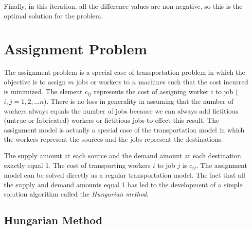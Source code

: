 \documentclass[12pt]{article}
\begin{document}
Finally, in this iteration, all the difference values are non-negative, so this is the optimal solution for the problem.

\section{Assignment Problem}

The assignment problem is a special case of transportation problem in which the objective is to
assign  $m$ jobs or workers to  $n$ machines such that the cost incurred is minimized.
The element $c_{ij}$ represents the cost of assigning worker $i$ to job ($i,j= 1,2, \ldots n$). There is no loss in
generality in assuming that the number of workers always equals the number of jobs because we
can always add fictitious (untrue or fabricated) workers or fictitious jobs to effect this result.
The assignment model is actually a special case of the transportation model in which the
workers represent the sources and the jobs represent the destinations.

The supply amount at each source and the demand amount at each destination exactly equal 1.
The cost of transporting workers $i$ to job $j$ is $c_{ij}$.
The assignment model can be solved directly as a regular transportation model.
The fact that all the supply and demand amounts equal 1 has led to the development of a simple
solution algorithm called the \emph{Hungarian method}.

\subsection{Hungarian Method}
\end{document}
